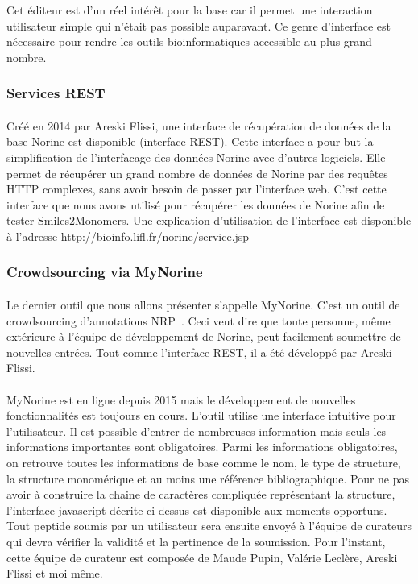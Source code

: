 \documentclass[12pt,french,twoside]{report}
\begin{document}
Cet éditeur est d'un réel intérêt pour la base car il permet une interaction utilisateur simple qui n'était pas possible auparavant.
Ce genre d'interface est nécessaire pour rendre les outils bioinformatiques accessible au plus grand nombre.



\subsubsection{Services REST}

\paragraph{}Créé en 2014 par Areski Flissi, une interface de récupération de données de la base Norine est disponible (interface REST).
Cette interface a pour but la simplification de l'interfacage des données Norine avec d'autres logiciels.
Elle permet de récupérer un grand nombre de données de Norine par des requêtes HTTP complexes, sans avoir besoin de passer par l'interface web.
C'est cette interface que nous avons utilisé pour récupérer les données de Norine afin de tester Smiles2Monomers.
Une explication d'utilisation de l'interface est disponible à l'adresse http://bioinfo.lifl.fr/norine/service.jsp



\subsubsection{Crowdsourcing via MyNorine}

\paragraph{}Le dernier outil que nous allons présenter s'appelle MyNorine.
C'est un outil de crowdsourcing d'annotations NRP~\cite{flissi_norine_2016}.
Ceci veut dire que toute personne, même extérieure à l'équipe de développement de Norine, peut facilement soumettre de nouvelles entrées.
Tout comme l'interface REST, il a été développé par Areski Flissi.

\paragraph{}MyNorine est en ligne depuis 2015 mais le développement de nouvelles fonctionnalités est toujours en cours.
L'outil utilise une interface intuitive pour l'utilisateur.
Il est possible d'entrer de nombreuses information mais seuls les informations importantes sont obligatoires.
Parmi les informations obligatoires, on retrouve toutes les informations de base comme le nom, le type de structure, la structure monomérique et au moins une référence bibliographique.
Pour ne pas avoir à construire la chaine de caractères compliquée représentant la structure, l'interface javascript décrite ci-dessus est disponible aux moments opportuns.
Tout peptide soumis par un utilisateur sera ensuite envoyé à l'équipe de curateurs qui devra vérifier la validité et la pertinence de la soumission.
Pour l'instant, cette équipe de curateur est composée de Maude Pupin, Valérie Leclère, Areski Flissi et moi même.
\end{document}
